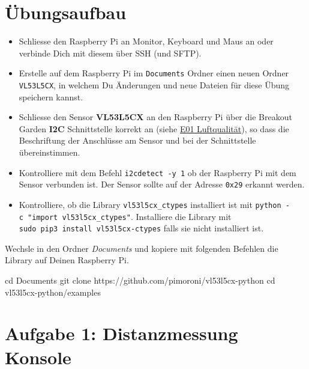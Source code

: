 \documentclass[
  11pt,
  a4paper,
  oneside, openany  ,captions=tableheading
]{scrbook}
\newenvironment{Shaded}{\begin{snugshade}}{\end{snugshade}}
\newcommand{\BuiltInTok}[1]{\textcolor[rgb]{0.00,0.23,0.31}{#1}}
\newcommand{\FunctionTok}[1]{\textcolor[rgb]{0.28,0.35,0.67}{#1}}
\newcommand{\NormalTok}[1]{\textcolor[rgb]{0.00,0.23,0.31}{#1}}
\providecommand{\tightlist}{%
  \setlength{\itemsep}{0pt}\setlength{\parskip}{0pt}}
\theoremstyle{remark}
\renewcommand{\markright}[1]{\def\chaptertitle{#1}} %
\begin{document}
\section*{Übungsaufbau}\label{uxfcbungsaufbau-3}

\markright{Übungsaufbau}

\begin{itemize}
\tightlist
\item
  Schliesse den Raspberry Pi an Monitor, Keyboard und Maus an oder
  verbinde Dich mit diesem über SSH (und SFTP).
\item
  Erstelle auf dem Raspberry Pi im \texttt{Documents} Ordner einen neuen
  Ordner \texttt{VL53L5CX}, in welchem Du Änderungen und neue Dateien
  für diese Übung speichern kannst.
\item
  Schliesse den Sensor \textbf{VL53L5CX} an den Raspberry Pi über die
  Breakout Garden \textbf{I2C} Schnittstelle korrekt an (siehe
  \href{E01_Luftqualitaet.qmd}{E01 Luftqualität}), so dass die
  Beschriftung der Anschlüsse am Sensor und bei der Schnittstelle
  übereinstimmen.
\item
  Kontrolliere mit dem Befehl \texttt{i2cdetect\ -y\ 1} ob der Raspberry
  Pi mit dem Sensor verbunden ist. Der Sensor sollte auf der Adresse
  \texttt{0x29} erkannt werden.
\item
  Kontrolliere, ob die Library \texttt{vl53l5cx\_ctypes} installiert ist
  mit \texttt{python\ -c\ "import\ vl53l5cx\_ctypes"}. Installiere die
  Library mit \texttt{sudo\ pip3\ install\ vl53l5cx-ctypes} falls sie
  nicht installiert ist.
\end{itemize}

Wechsle in den Ordner \emph{Documents} und kopiere mit folgenden
Befehlen die Library auf Deinen Raspberry Pi.

\begin{Shaded}
\begin{Highlighting}[]
\BuiltInTok{cd}\NormalTok{ Documents}
\FunctionTok{git}\NormalTok{ clone https://github.com/pimoroni/vl53l5cx{-}python}
\BuiltInTok{cd}\NormalTok{ vl53l5cx{-}python/examples}
\end{Highlighting}
\end{Shaded}

\section*{Aufgabe 1: Distanzmessung
Konsole}\label{aufgabe-1-distanzmessung-konsole}
\end{document}
